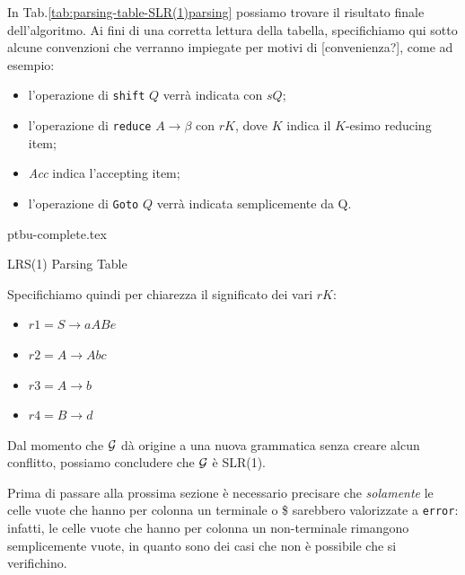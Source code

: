 \documentclass[class=book, crop=false, oneside, 12pt]{standalone}
\begin{document}
In Tab.\ref{tab:parsing-table-SLR(1)parsing} possiamo trovare il risultato finale dell'algoritmo. Ai fini di una corretta lettura della tabella, specifichiamo qui sotto alcune convenzioni che verranno impiegate per motivi di [convenienza?], come ad esempio:
\begin{itemize}
    \item l'operazione di \texttt{shift} \(Q\) verrà indicata con \(sQ\);
    \item l'operazione di \texttt{reduce} \(A \rightarrow \beta\) con \(rK\), dove \(K\) indica il \(K\)-esimo reducing item;
    \item \emph{Acc} indica l'accepting item;
    \item l'operazione di \texttt{Goto} \(Q\) verrà indicata semplicemente da Q.
\end{itemize}
\begin{table}[H]
    \centering
    {ptbu-complete.tex}
    \caption{LRS(1) Parsing Table}
    \label{tab:parsing-table-SLR(1)parsing}
\end{table}
Specifichiamo quindi per chiarezza il significato dei vari \(rK\):
\begin{itemize}
    \item \(r1 = S \to aABe\)
    \item \(r2 = A \to Abc\)
    \item \(r3 = A \to b\)
    \item \(r4 = B \to d\)
\end{itemize}

Dal momento che \(\mathcal{G}\) dà origine a una nuova grammatica senza creare alcun conflitto, possiamo concludere che \(\mathcal{G}\) è SLR(1).

Prima di passare alla prossima sezione è necessario precisare che \emph{solamente} le celle vuote che hanno per colonna un terminale o \$ sarebbero valorizzate a \texttt{error}: infatti, le celle vuote che hanno per colonna un non-terminale rimangono semplicemente vuote, in quanto sono dei casi che non è possibile che si verifichino. 
\end{document}

